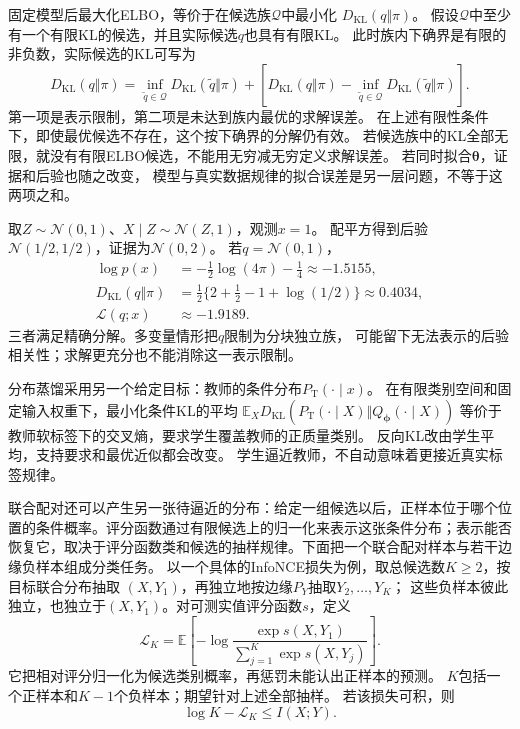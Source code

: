 固定模型后最大化ELBO，等价于在候选族\(\mathcal Q\)中最小化
\(D_{\mathrm{KL}}(q\Vert\pi)\)。
假设\(\mathcal Q\)中至少有一个有限KL的候选，并且实际候选\(q\)也具有有限KL。
此时族内下确界是有限的非负数，实际候选的KL可写为
\[
  D_{\mathrm{KL}}(q\Vert\pi)
  =\inf_{\widetilde q\in\mathcal Q}D_{\mathrm{KL}}(\widetilde q\Vert\pi)
   +\left[D_{\mathrm{KL}}(q\Vert\pi)
    -\inf_{\widetilde q\in\mathcal Q}D_{\mathrm{KL}}(\widetilde q\Vert\pi)\right].
\]
第一项是表示限制，第二项是未达到族内最优的求解误差。
在上述有限性条件下，即使最优候选不存在，这个按下确界的分解仍有效。
若候选族中的KL全部无限，就没有有限ELBO候选，不能用无穷减无穷定义求解误差。
若同时拟合\(\bm\theta\)，证据和后验也随之改变，
模型与真实数据规律的拟合误差是另一层问题，不等于这两项之和。

取\(Z\sim\mathcal N(0,1)\)、\(X\mid Z\sim\mathcal N(Z,1)\)，观测\(x=1\)。
配平方得到后验\(\mathcal N(1/2,1/2)\)，证据为\(\mathcal N(0,2)\)。
若\(q=\mathcal N(0,1)\)，
\[
\begin{aligned}
  \log p(x)&=-\tfrac12\log(4\pi)-\tfrac14\approx-1.5155,\\
  D_{\mathrm{KL}}(q\Vert\pi)
  &=\tfrac12\{2+\tfrac12-1+\log(1/2)\}\approx0.4034,\\
  \mathcal L(q;x)&\approx-1.9189.
\end{aligned}
\]
三者满足精确分解。多变量情形把\(q\)限制为分块独立族，
可能留下无法表示的后验相关性；求解更充分也不能消除这一表示限制。

分布蒸馏采用另一个给定目标：教师的条件分布\(P_{\mathrm T}(\cdot\mid x)\)。
在有限类别空间和固定输入权重下，最小化条件KL的平均
\(\mathbb E_XD_{\mathrm{KL}}(P_{\mathrm T}(\cdot\mid X)\Vert Q_{\bm\phi}(\cdot\mid X))\)
等价于教师软标签下的交叉熵，要求学生覆盖教师的正质量类别。
反向KL改由学生平均，支持要求和最优近似都会改变。
学生逼近教师，不自动意味着更接近真实标签规律。

联合配对还可以产生另一张待逼近的分布：给定一组候选以后，正样本位于哪个位置的条件概率。评分函数通过有限候选上的归一化来表示这张条件分布；表示能否恢复它，取决于评分函数类和候选的抽样规律。下面把一个联合配对样本与若干边缘负样本组成分类任务。
以一个具体的InfoNCE损失为例，取总候选数\(K\geq2\)，按目标联合分布抽取
\((X,Y_1)\)，再独立地按边缘\(P_Y\)抽取\(Y_2,\ldots,Y_K\)；
这些负样本彼此独立，也独立于\((X,Y_1)\)。对可测实值评分函数\(s\)，定义
\begin{equation}
 \mathcal L_K
 =\mathbb E\left[-\log
   \frac{\exp s(X,Y_1)}{\sum_{j=1}^K\exp s(X,Y_j)}\right].
 \label{eq:information-contrastive-loss}
\end{equation}
它把相对评分归一化为候选类别概率，再惩罚未能认出正样本的预测。
\(K\)包括一个正样本和\(K-1\)个负样本；期望针对上述全部抽样。
若该损失可积，则
\[
 \log K-\mathcal L_K\leq I(X;Y).
\]

